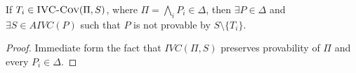 

%
\begin{lemma}
\label{lem:ivc-acc}
If $T_i \in \text{\sc IVC-Cov}(\Pi, S)$, where $\Pi = \bigwedge_{i} {P_i \in \Delta}$, then $\exists P \in \Delta$ and $\exists S \in AIVC(P)$ such that $P$ is not provable by $S \setminus \{T_i \}$.
\end{lemma}
\begin{proof}
Immediate form the fact that $IVC (\Pi, S)$ preserves provability of $\Pi$ and every $P_i \in \Delta$.
\end{proof}
\vspace{2mm}



